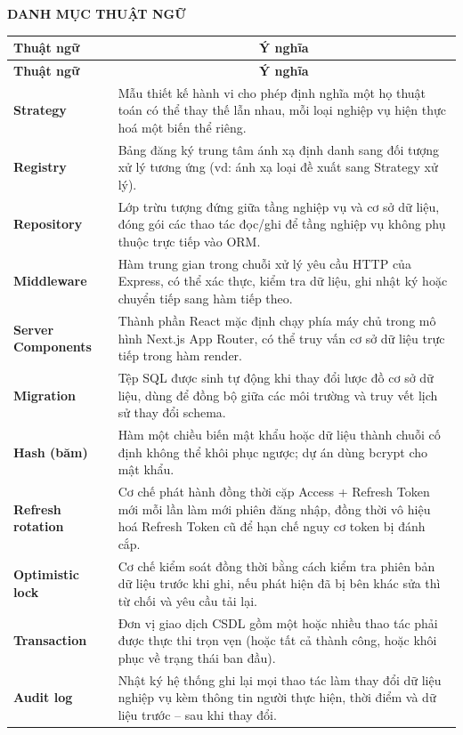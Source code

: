 \documentclass[../DoAn.tex]{subfiles}
\begin{document}
\begin{center}
    \Large{\textbf{DANH MỤC THUẬT NGỮ}}
\end{center}
\vspace{0.6cm}

\renewcommand{\arraystretch}{1.25}
\begin{longtable}{|>{\centering\arraybackslash}p{3.6cm}|p{10.5cm}|}
\hline
\textbf{Thuật ngữ} & \multicolumn{1}{c|}{\textbf{Ý nghĩa}} \\ \hline
\endfirsthead
\hline
\textbf{Thuật ngữ} & \multicolumn{1}{c|}{\textbf{Ý nghĩa}} \\ \hline
\endhead
\hline
\endfoot
\textbf{Strategy}              & Mẫu thiết kế hành vi cho phép định nghĩa một họ thuật toán có thể thay thế lẫn nhau, mỗi loại nghiệp vụ hiện thực hoá một biến thể riêng. \\ \hline
\textbf{Registry}              & Bảng đăng ký trung tâm ánh xạ định danh sang đối tượng xử lý tương ứng (vd: ánh xạ loại đề xuất sang Strategy xử lý). \\ \hline
\textbf{Repository}            & Lớp trừu tượng đứng giữa tầng nghiệp vụ và cơ sở dữ liệu, đóng gói các thao tác đọc/ghi để tầng nghiệp vụ không phụ thuộc trực tiếp vào ORM. \\ \hline
\textbf{Middleware}            & Hàm trung gian trong chuỗi xử lý yêu cầu HTTP của Express, có thể xác thực, kiểm tra dữ liệu, ghi nhật ký hoặc chuyển tiếp sang hàm tiếp theo. \\ \hline
\textbf{Server Components}     & Thành phần React mặc định chạy phía máy chủ trong mô hình Next.js App Router, có thể truy vấn cơ sở dữ liệu trực tiếp trong hàm render. \\ \hline
\textbf{Migration}             & Tệp SQL được sinh tự động khi thay đổi lược đồ cơ sở dữ liệu, dùng để đồng bộ giữa các môi trường và truy vết lịch sử thay đổi schema. \\ \hline
\textbf{Hash (băm)}            & Hàm một chiều biến mật khẩu hoặc dữ liệu thành chuỗi cố định không thể khôi phục ngược; dự án dùng bcrypt cho mật khẩu. \\ \hline
\textbf{Refresh rotation}      & Cơ chế phát hành đồng thời cặp Access + Refresh Token mới mỗi lần làm mới phiên đăng nhập, đồng thời vô hiệu hoá Refresh Token cũ để hạn chế nguy cơ token bị đánh cắp. \\ \hline
\textbf{Optimistic lock}       & Cơ chế kiểm soát đồng thời bằng cách kiểm tra phiên bản dữ liệu trước khi ghi, nếu phát hiện đã bị bên khác sửa thì từ chối và yêu cầu tải lại. \\ \hline
\textbf{Transaction}           & Đơn vị giao dịch CSDL gồm một hoặc nhiều thao tác phải được thực thi trọn vẹn (hoặc tất cả thành công, hoặc khôi phục về trạng thái ban đầu). \\ \hline
\textbf{Audit log}             & Nhật ký hệ thống ghi lại mọi thao tác làm thay đổi dữ liệu nghiệp vụ kèm thông tin người thực hiện, thời điểm và dữ liệu trước -- sau khi thay đổi. \\ \hline
\end{longtable}
\end{document}
